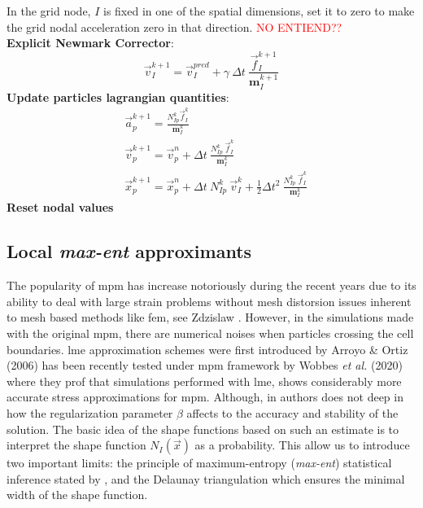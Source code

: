 \documentclass[preprint,12pt,a4paper]{elsarticle}
\newcommand{\tens}[1]{
  \ensuremath{\mathbf{{#1}}}
}
\newcommand{\red}[1]{
  \textcolor{red}{{#1}}
}
\begin{document}
\begin{algorithm}
\begin{algorithmic}[1]
    In the grid node, $I$ is fixed in one of the spatial dimensions, set it to
    zero to make the grid nodal acceleration zero in that direction.\red{NO ENTIEND??}\\
    \STATE \textbf{Explicit Newmark Corrector}:
    \begin{equation*}
      \vec{v}_{I}^{k+1} = \vec{v}_{I}^{pred} + \gamma\ \Delta t\ \frac{\vec{f}_{I}^{k+1}}{\tens{m}_I^{k+1}}  
    \end{equation*}
    \STATE \textbf{Update particles lagrangian quantities}:
    \begin{align*}
      &\vec{a}_p^{k+1} = \frac{N_{Ip}^k\vec{f}_{I}^{k}}{\tens{m}_I^k}\\
      &\vec{v}_p^{k+1} = \vec{v}_p^n + \Delta t\
        \frac{N_{Ip}^k\
        \vec{f}_{I}^{k}}{\tens{m}_I^k}\\
      &\vec{x}_p^{k+1} = \vec{x}_p^n + \Delta t\
         N_{Ip}^k\ \vec{v}_{I}^{k} +
        \frac{1}{2}\Delta t^2\ \frac{N_{Ip}^k\
        \vec{f}_{I}^{k}}{\tens{m}_I^k}
    \end{align*}
    \STATE \textbf{Reset nodal values}
  \end{algorithmic}
\end{algorithm}

\subsection{Local \textit{max-ent} approximants}
\label{sec:local-max-ent}
The popularity of \acrshort{mpm} has increase notoriously during
the recent years due to its ability to deal with large strain problems
without mesh distorsion issues inherent to mesh based methods like
\acrshort{fem}, see Zdzislaw \cite{Wieckowski2004}. However, in the simulations
made with the original \acrshort{mpm}, there are numerical noises when particles
crossing the cell boundaries. \acrfull{lme} approximation schemes were
first introduced by Arroyo \& Ortiz (2006)\cite{Arroyo2006} has been
recently tested under \acrshort{mpm} framework by Wobbes {\it et al.}
(2020)\cite{Wobbes2020} where they prof that simulations performed
with \acrshort{lme}, shows considerably more accurate stress
approximations for \acrshort{mpm}. Although, in \cite{Wobbes2020}
authors does not deep in how the regularization parameter $\beta$
affects to the accuracy and stability of the solution. The basic idea
of the shape functions based on such an estimate is to interpret the shape function $N_I(\vec{x})$ as a probability. This allow us to introduce two important limits:
the principle of maximum-entropy (\textit{max-ent}) statistical
inference stated by \cite{Jaynes1957}, and the Delaunay triangulation
which ensures the minimal width of the shape function. 
\end{document}
